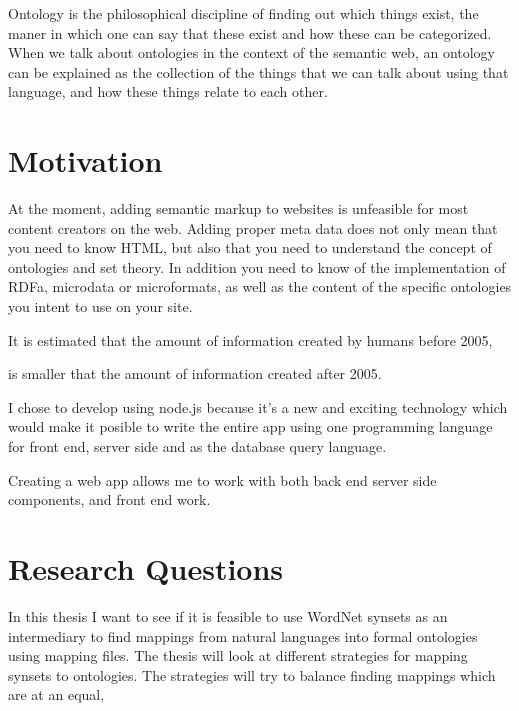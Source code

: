 Ontology is the philosophical discipline of finding out which things exist, 
the maner in which one can say that these exist and how these can be categorized. 
When we talk about ontologies in the context of the semantic web, 
an ontology can be explained as the collection of the things that we can talk about using that language, 
and how these things relate to each other.


\section{Motivation}
At the moment, adding semantic markup to websites is unfeasible for most content creators on the web.
Adding proper meta data does not only mean that you need to know HTML, 
but also that you need to understand the concept of ontologies and set theory. 
In addition you need to know of the implementation of RDFa, microdata or microformats, 
as well as the content of the specific ontologies you intent to use on your site.


It is estimated that the amount of information created by humans before 2005, 

is smaller that the amount of information created after 2005.

I chose to develop using node.js because it's a new and exciting technology which would make it posible to write the entire app using one programming language for front end, 
server side and as the database query language.

Creating a web app allows me to work with both back end server side components, 
and front end work. 


\section{Research Questions}
In this thesis I want to see if it is feasible to use WordNet synsets as an intermediary 
to find mappings from natural languages into formal ontologies using mapping files.
The thesis will look at different strategies for mapping synsets to ontologies. 
The strategies will try to balance finding mappings which are at an equal, 

